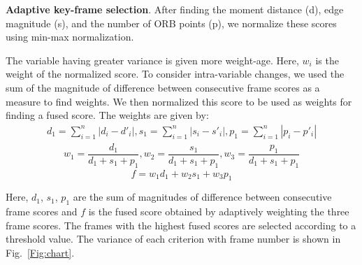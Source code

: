 \documentclass[journal]{IEEEtran}
\begin{document}
\textbf{Adaptive key-frame selection}.
After finding the moment distance (d), edge magnitude (s), and the number of ORB points (p), we normalize these scores using min-max normalization.

The variable having greater variance is given more weight-age. Here, $w_i$ is the weight of the normalized score. To consider intra-variable changes, we used the sum of the magnitude of difference between consecutive frame scores as a measure to find weights. We then normalized this score to be used as weights for finding a fused score. The weights are given by:
 \begin{gather}
d_{1}=\sum_{i=1}^{n}{|d_{i}-d'_{i}|} ,
s_{1}=\sum_{i=1}^{n}{|s_{i}-s'_{i}|} ,
p_{1}=\sum_{i=1}^{n}{|p_{i}-p'_{i}|}
\end{gather}
\begin{gather}
w_{1}=\dfrac{d_{1}}{d_{1}+s_{1}+p_{1}},
w_{2}=\dfrac{s_{1}}{d_{1}+s_{1}+p_{1}}, 
w_{3}=\dfrac{p_{1}}{d_{1}+s_{1}+p_{1}}
\end{gather}
\begin{equation}
f=w_{1}d_{1}+w_{2}s_{1}+w_{3}p_{1}
\end{equation}


Here, $d_1$, $s_1$, $p_1$ are the sum of magnitudes of difference between consecutive frame scores and $f$ is the fused score obtained by adaptively weighting the three frame scores. The frames with the highest fused scores are selected according to a threshold value. The variance of each criterion with frame number is shown in Fig.~\ref{Fig:chart}.
\end{document}
